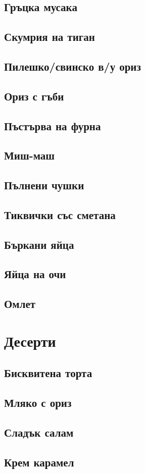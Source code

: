\documentclass{article}
\begin{document}
    \subsection{Гръцка мусака}
    \subsection{Скумрия на тиган}
    \subsection{Пилешко/свинско в/у ориз}
    \subsection{Ориз с гъби}
    \subsection{Пъстърва на фурна}
    \subsection{Миш-маш}
    \subsection{Пълнени чушки}
    \subsection{Тиквички със сметана}
    \subsection{Бъркани яйца}
    \subsection{Яйца на очи}
    \subsection{Омлет}

\section{Десерти}
    \subsection{Бисквитена торта}
    \subsection{Мляко с ориз}
    \subsection{Сладък салам}
    \subsection{Крем карамел}
\end{document}
